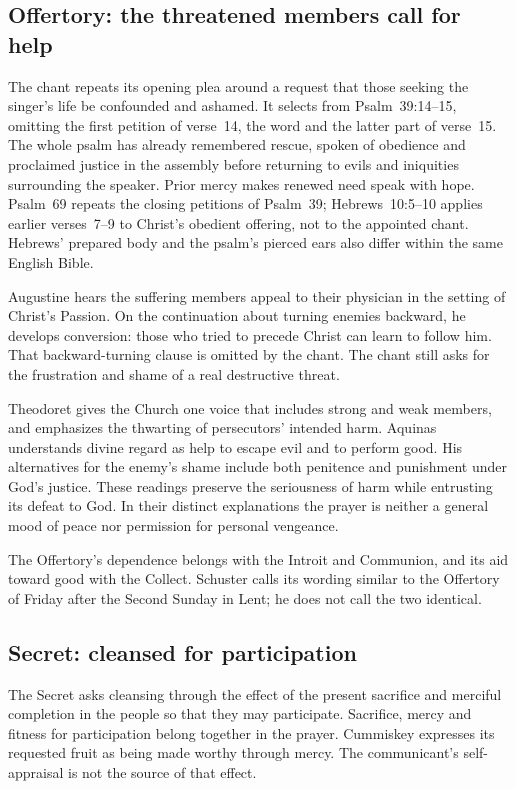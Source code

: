 \subsection*{Offertory: the threatened members call for help}
The chant repeats its opening plea around a request that those seeking the singer's life be confounded and ashamed. It selects from Psalm~39:14--15, omitting the first petition of verse~14, the word  and the latter part of verse~15. The whole psalm has already remembered rescue, spoken of obedience and proclaimed justice in the assembly before returning to evils and iniquities surrounding the speaker. Prior mercy makes renewed need speak with hope. Psalm~69 repeats the closing petitions of Psalm~39; Hebrews~10:5--10 applies earlier verses~7--9 to Christ's obedient offering, not to the appointed chant. Hebrews' prepared body and the psalm's pierced ears also differ within the same English Bible.

Augustine hears the suffering members appeal to their physician in the setting of Christ's Passion. On the continuation about turning enemies backward, he develops conversion: those who tried to precede Christ can learn to follow him. That backward-turning clause is omitted by the chant. The chant still asks for the frustration and shame of a real destructive threat. 

Theodoret gives the Church one voice that includes strong and weak members, and emphasizes the thwarting of persecutors' intended harm. Aquinas understands divine regard as help to escape evil and to perform good. His alternatives for the enemy's shame include both penitence and punishment under God's justice. These readings preserve the seriousness of harm while entrusting its defeat to God. In their distinct explanations the prayer is neither a general mood of peace nor permission for personal vengeance. 

The Offertory's dependence belongs with the Introit and Communion, and its aid toward good with the Collect. Schuster calls its wording similar to the Offertory of Friday after the Second Sunday in Lent; he does not call the two identical. 

\subsection*{Secret: cleansed for participation}
The Secret asks cleansing through the effect of the present sacrifice and merciful completion in the people so that they may participate. Sacrifice, mercy and fitness for participation belong together in the prayer. Cummiskey expresses its requested fruit as being made worthy through mercy. The communicant's self-appraisal is not the source of that effect.

